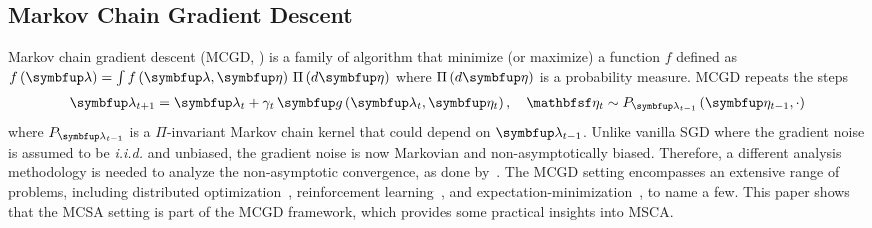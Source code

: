 \subsection{Markov Chain Gradient Descent}\label{section:mcgd}
Markov chain gradient descent (MCGD, \citealt{duchi_ergodic_2012, NEURIPS2018_1371bcce}) is a family of algorithm that minimize (or maximize) a function \(f\) defined as \(f\left(\vlambda\right) = \int f\left(\vlambda, \veta\right) \, \Pi\left(d\veta\right)\) where \(\Pi\left(d\veta\right)\) is a probability measure.
MCGD repeats the steps 
{%
\begin{align}
  \vlambda_{t+1}    = \vlambda_{t} + \gamma_t \, \vg\left(\vlambda_t, \veta_{t}\right),\quad 
  \rvveta_{t}  \sim P_{\vlambda_{t-1}}\left( \veta_{t-1}, \cdot \right)\label{eq:mcgd}
\end{align}
}%
where \(P_{\vlambda_{t-1}}\) is a \(\Pi\)-invariant Markov chain kernel that could depend on \(\vlambda_{t-1}\).
Unlike vanilla SGD where the gradient noise is assumed to be \textit{i.i.d.} and unbiased, the gradient noise is now Markovian and non-asymptotically biased.
Therefore, a different analysis methodology is needed to analyze the non-asymptotic convergence, as done by~\citep{duchi_ergodic_2012, NEURIPS2018_1371bcce, pmlr-v99-karimi19a, doan_finitetime_2020, doan_convergence_2020, Xiong_Xu_Liang_Zhang_2021, debavelaere_convergence_2021}.
The MCGD setting encompasses an extensive range of problems, including distributed optimization~\citep{ram_incremental_2009}, reinforcement learning~\citep{tadic_asymptotic_2017, doan_convergence_2020, Xiong_Xu_Liang_Zhang_2021}, and expectation-minimization~\citep{pmlr-v99-karimi19a}, to name a few.
This paper shows that the MCSA setting is part of the MCGD framework, which provides some practical insights into MSCA.

